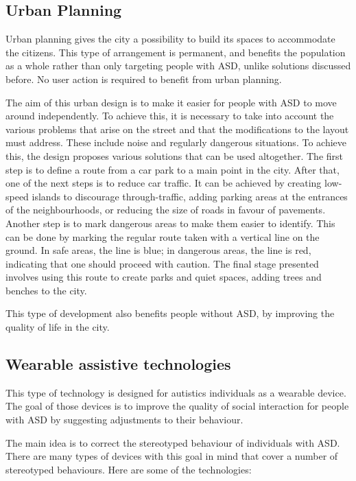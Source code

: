 \subsection{Urban Planning}

Urban planning gives the city a possibility to build its spaces to accommodate the citizens. This type of arrangement is permanent, and benefits the population as a whole rather than only targeting people with ASD, unlike solutions discussed before. No user action is required to benefit from urban planning.

The aim of this urban design is to make it easier for people with ASD to move around independently\cite{2018MobilityPoliciesExtraSmall}. To achieve this, it is necessary to take into account the various problems that arise on the street and that the modifications to the layout must address. These include noise and regularly dangerous situations. To achieve this, the design proposes various solutions that can be used altogether. The first step is to define a route from a car park to a main point in the city. After that, one of the next steps is to reduce car traffic. It can be achieved by creating low-speed islands to discourage through-traffic, adding parking areas at the entrances of the neighbourhoods, or reducing the size of roads in favour of pavements. Another step is to mark dangerous areas to make them easier to identify. This can be done by marking the regular route taken with a vertical line on the ground. In safe areas, the line is blue; in dangerous areas, the line is red, indicating that one should proceed with caution. The final stage presented involves using this route to create parks and quiet spaces, adding trees and benches to the city.

This type of development also benefits people without ASD, by improving the quality of life in the city\cite{2018MobilityPoliciesExtraSmall}.

\subsection{Wearable assistive technologies}

This type of technology is designed for autistics individuals as a wearable device. The goal of those devices is to improve the quality of social interaction for people with ASD by suggesting adjustments to their behaviour.

The main idea is to correct the stereotyped behaviour of individuals with ASD\cite{2018WearableAssistiveTechnologies}. There are many types of devices with this goal in mind that cover a number of stereotyped behaviours. Here are some of the technologies:

